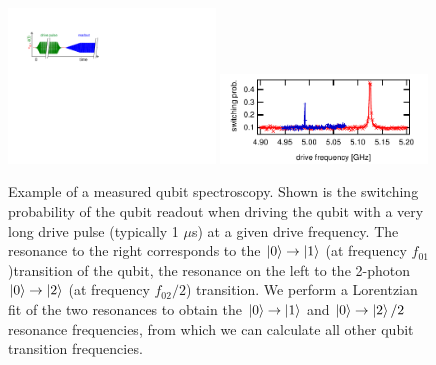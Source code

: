 \begin{figure}[ht!]
\centering
\includegraphics[width=0.49\textwidth]{"./material/figures/measurement/qubit_spectroscopy"}
\includegraphics[width=0.49\textwidth]{"./data/ct5/2011_04_21 - grover and tomo/example - qubit 2 spectroscopy"}
\caption[]{Example of a measured qubit spectroscopy. Shown is the switching probability of the qubit readout when driving the qubit with a very long drive pulse (typically 1 $\mu$s) at a given drive frequency. The resonance to the right corresponds to the $\left| 0 \right>\to\left| 1 \right>$ (at frequency $f_{01}$)transition of the qubit, the resonance on the left to the 2-photon $\left| 0 \right>\to\left| 2 \right>$ (at frequency $f_{02}/2$) transition. We perform a Lorentzian fit of the two resonances to obtain the $\left| 0 \right>\to\left| 1 \right>$ and $\left| 0 \right>\to\left| 2 \right>/2$ resonance frequencies, from which we can calculate all other qubit transition frequencies.}
\label{fig:qubit_spectroscopy_example}
\end{figure}

